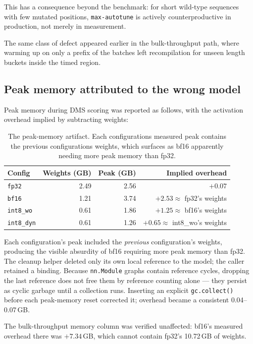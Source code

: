 \documentclass[11pt]{article}
\newcommand{\cfg}[1]{\texttt{#1}}
\begin{document}
This has a consequence beyond the benchmark: for short wild-type sequences with
few mutated positions, \texttt{max-autotune} is actively counterproductive in
production, not merely in measurement.

The same class of defect appeared earlier in the bulk-throughput path, where
warming up on only a prefix of the batches left recompilation for unseen length
buckets inside the timed region.

\subsection{Peak memory attributed to the wrong model}

Peak memory during DMS scoring was reported as follows, with the activation
overhead implied by subtracting weights:

\begin{table}[htb]
\centering
\caption{The peak-memory artifact. Each configurations measured peak contains the previous configurations weights, which surfaces as bf16 apparently needing more peak memory than fp32.}
\small
\begin{tabular}{lrrr}
\toprule
Config & Weights (GB) & Peak (GB) & Implied overhead \\
\midrule
\cfg{fp32}      & 2.49 & 2.56 & $+0.07$ \\
\cfg{bf16}      & 1.21 & 3.74 & $+2.53 \approx$ fp32's weights \\
\cfg{int8\_wo}  & 0.61 & 1.86 & $+1.25 \approx$ bf16's weights \\
\cfg{int8\_dyn} & 0.61 & 1.26 & $+0.65 \approx$ int8\_wo's weights \\
\bottomrule
\end{tabular}
\end{table}

Each configuration's peak included the \emph{previous} configuration's weights,
producing the visible absurdity of bf16 requiring more peak memory than fp32.
The cleanup helper deleted only its own local reference to the model; the caller
retained a binding. Because \texttt{nn.Module} graphs contain reference cycles,
dropping the last reference does not free them by reference counting alone ---
they persist as cyclic garbage until a collection runs. Inserting an explicit
\texttt{gc.collect()} before each peak-memory reset corrected it; overhead
became a consistent 0.04--0.07\,GB.

The bulk-throughput memory column was verified unaffected: bf16's measured
overhead there was $+7.34$\,GB, which cannot contain fp32's 10.72\,GB of
weights.
\end{document}
